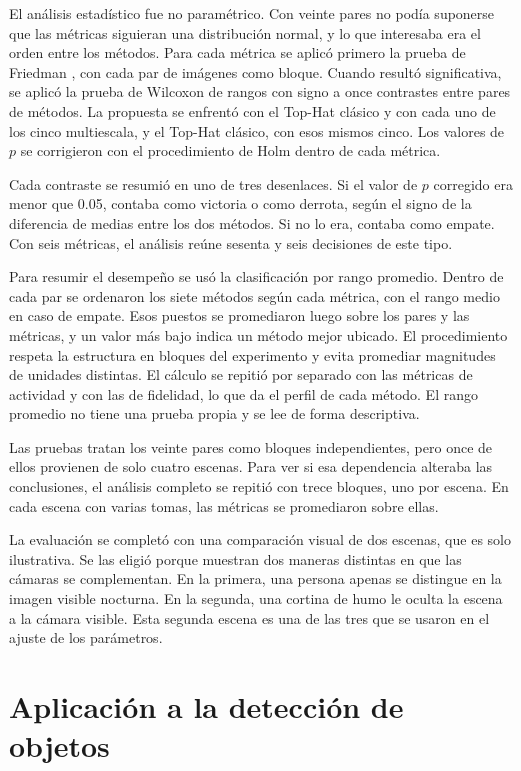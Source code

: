 El análisis estadístico fue no paramétrico. Con veinte pares no podía suponerse que las métricas
siguieran una distribución normal, y lo que interesaba era el orden entre los métodos. Para cada métrica
se aplicó primero la prueba de Friedman \parencite{friedman1937}, con cada par de imágenes como bloque.
Cuando resultó significativa, se aplicó la prueba de Wilcoxon de rangos con signo
\parencite{wilcoxon1945} a once contrastes entre pares de métodos. La propuesta se enfrentó con el
Top-Hat clásico y con cada uno de los cinco multiescala, y el Top-Hat clásico, con esos mismos cinco.
Los valores de $p$ se corrigieron con el procedimiento de Holm \parencite{holm1979} dentro de cada
métrica.

Cada contraste se resumió en uno de tres desenlaces. Si el valor de $p$ corregido era menor que 0.05,
contaba como victoria o como derrota, según el signo de la diferencia de medias entre los dos métodos.
Si no lo era, contaba como empate. Con seis métricas, el análisis reúne sesenta y seis decisiones de
este tipo.

Para resumir el desempeño se usó la clasificación por rango promedio. Dentro de cada par se ordenaron
los siete métodos según cada métrica, con el rango medio en caso de empate. Esos puestos se promediaron
luego sobre los pares y las métricas, y un valor más bajo indica un método mejor ubicado. El
procedimiento respeta la estructura en bloques del experimento y evita promediar magnitudes de unidades
distintas. El cálculo se repitió por separado con las métricas de actividad y con las de fidelidad, lo
que da el perfil de cada método. El rango promedio no tiene una prueba propia y se lee de forma
descriptiva.

Las pruebas tratan los veinte pares como bloques independientes, pero once de ellos provienen de solo
cuatro escenas. Para ver si esa dependencia alteraba las conclusiones, el análisis completo se repitió
con trece bloques, uno por escena. En cada escena con varias tomas, las métricas se promediaron sobre
ellas.

La evaluación se completó con una comparación visual de dos escenas, que es solo ilustrativa. Se las
eligió porque muestran dos maneras distintas en que las cámaras se complementan. En la primera, una
persona apenas se distingue en la imagen visible nocturna. En la segunda, una cortina de humo le oculta
la escena a la cámara visible. Esta segunda escena es una de las tres que se usaron en el ajuste de los
parámetros.

\section{Aplicación a la detección de objetos}
\label{sec:protocolo-deteccion}

